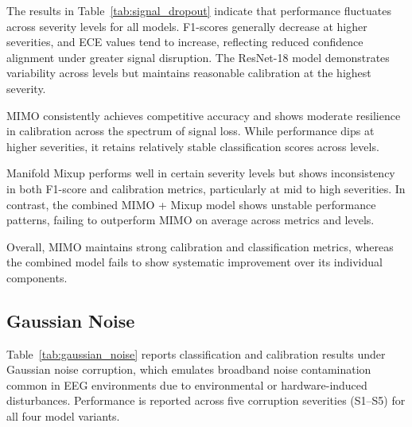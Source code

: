 The results in Table~\ref{tab:signal_dropout} indicate that performance fluctuates across severity levels for all models. F1-scores generally decrease at higher severities, and ECE values tend to increase, reflecting reduced confidence alignment under greater signal disruption. The ResNet-18 model demonstrates variability across levels but maintains reasonable calibration at the highest severity.

MIMO consistently achieves competitive accuracy and shows moderate resilience in calibration across the spectrum of signal loss. While performance dips at higher severities, it retains relatively stable classification scores across levels.

Manifold Mixup performs well in certain severity levels but shows inconsistency in both F1-score and calibration metrics, particularly at mid to high severities. In contrast, the combined MIMO + Mixup model shows unstable performance patterns, failing to outperform MIMO on average across metrics and levels.

Overall, MIMO maintains strong calibration and classification metrics, whereas the combined model fails to show systematic improvement over its individual components.

\subsection{Gaussian Noise}
\label{subsec:gaussian_noise}

Table~\ref{tab:gaussian_noise} reports classification and calibration results under Gaussian noise corruption, which emulates broadband noise contamination common in EEG environments due to environmental or hardware-induced disturbances. Performance is reported across five corruption severities (S1–S5) for all four model variants.

